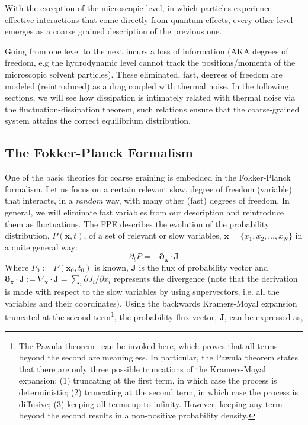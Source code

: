 \documentclass[ twoside,openright,titlepage,numbers=noenddot,%
headinclude,footinclude,cleardoublepage=empty,abstract=on,
BCOR=5mm,paper=b5,fontsize=11pt, dvipsnames
]{scrreprt}
\renewcommand{\vec}[1]{\bm{#1}}
\begin{document}
With the exception of the microscopic level, in which particles experience effective interactions that come directly from quantum effects, every other level emerges as a coarse grained description of the previous one. 

Going from one level to the next incurs a loss of information (AKA degrees of freedom, e.g the hydrodynamic level cannot track the positions/momenta of the microscopic solvent particles). These eliminated, fast, degrees of freedom are modeled (reintroduced) as a drag coupled with thermal noise. In the following sections, we will see how dissipation is intimately related with thermal noise via the fluctuation-dissipation theorem, such relations ensure that the coarse-grained system attains the correct equilibrium distribution.


\subsection{The Fokker-Planck Formalism}\label{sec:fpe}
One of the basic theories for coarse graining is embedded in the Fokker-Planck formalism. Let us focus on a certain relevant slow, degree of freedom (variable) that interacts, in a \emph{random} way, with many other (fast) degrees of freedom. In general, we will eliminate fast variables from our description and reintroduce them as fluctuations. The \gls{FPE} describes the evolution of the probability distribution, $P(\vec{x},t)$, of a set of relevant or slow variables, $\vec{x} = \{x_1, x_2,\dots, x_N\}$ in a quite general way:
  \begin{equation}
    \label{eq:fpe}
    \partial_t P = -\vec{\partial}_{\vec{x}}\cdot \vec{J}
  \end{equation}
Where $P_0 := P(\vec{x}_0, t_0)$ is known, $\vec{J}$ is the flux of probability vector  and $\vec{\partial}_{\vec{x}}\cdot \vec{J} := \nabla_{\vec{x}}\cdot\vec{J} = \sum_i\partial J_i/\partial x_i  $ represents the divergence (note that the derivation is made with respect to the slow variables by using supervectors, i.e. all the variables and their coordinates\cite{Dhont1996}).
Using the backwards Kramers-Moyal expansion~\cite{Risken2012} truncated at the second term\footnote{The Pawula theorem~\cite{Tabar2019} can be invoked here, which proves that all terms beyond the second are meaningless. In particular, the Pawula theorem states that there are only three possible truncations of the Kramers-Moyal expansion: (1) truncating at the first term, in which case the process is deterministic; (2) truncating at the second term, in which case the process is diffusive; (3) keeping all terms up to infinity. However, keeping any term beyond the second results in a non-positive probability density.}, the probability flux vector, $\vec{J}$, can be expressed as,
\end{document}

